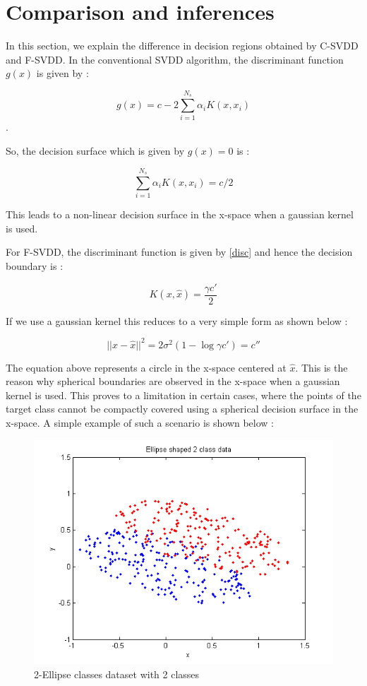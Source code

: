 \documentclass{article} %
\begin{document}
\section{Comparison and inferences}
In this section, we explain the difference in decision regions obtained by C-SVDD and F-SVDD. In the conventional SVDD algorithm, the discriminant function $g(x)$ is given by :

\[ g(x) = c - 2 \sum\limits_{i=1}^{N_s}\alpha_i K(x,x_i) \].

So, the decision surface which is given by $g(x) = 0$ is   :

\[  \sum\limits_{i=1}^{N_s}\alpha_i K(x,x_i)  = c/2 \]

This leads to a non-linear decision surface in the x-space when a gaussian kernel is used.

For F-SVDD, the discriminant function is given by \ref{disc} and hence the decision boundary is :

\[ K(x,\hat{x}) = \frac{\gamma c'}{2}\]

If we use a gaussian kernel this reduces to a very simple form as shown below :

\[ || x - \hat{x}||^2 = 2 \sigma^2 (1 - \log{\gamma c'}) = c''\] 

The equation above represents a circle in the x-space centered at $\hat{x}$. This is the reason why spherical boundaries are observed in the x-space when a gaussian kernel is used. This proves to a limitation in certain cases, where the points of the target class cannot be compactly covered using a spherical decision surface in the x-space. A simple example of such a scenario is shown below :


\begin{figure}[H]
  \centering
  \includegraphics[width=0.8\linewidth]{Plots/Ellipse/svdd/data}
  \caption{2-Ellipse classes dataset with 2 classes}
\end{figure}
\end{document}

